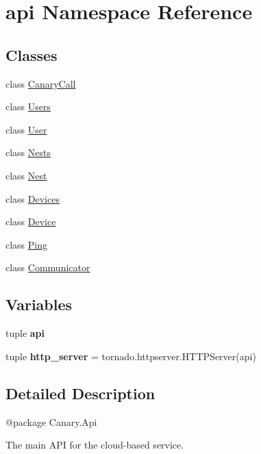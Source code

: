 \hypertarget{namespaceapi}{\section{api Namespace Reference}
\label{namespaceapi}
}
\subsection*{Classes}
\begin{DoxyCompactItemize}
\item 
class \hyperlink{classapi_1_1_canary_call}{Canary\-Call}
\item 
class \hyperlink{classapi_1_1_users}{Users}
\item 
class \hyperlink{classapi_1_1_user}{User}
\item 
class \hyperlink{classapi_1_1_nests}{Nests}
\item 
class \hyperlink{classapi_1_1_nest}{Nest}
\item 
class \hyperlink{classapi_1_1_devices}{Devices}
\item 
class \hyperlink{classapi_1_1_device}{Device}
\item 
class \hyperlink{classapi_1_1_ping}{Ping}
\item 
class \hyperlink{classapi_1_1_communicator}{Communicator}
\end{DoxyCompactItemize}
\subsection*{Variables}
\begin{DoxyCompactItemize}
\item 
tuple {\bfseries api}
\item 
\hypertarget{namespaceapi_a1125afafaabf4d39e0f633946f62eecd}{tuple {\bfseries http\-\_\-server} = tornado.\-httpserver.\-H\-T\-T\-P\-Server(api)}\label{namespaceapi_a1125afafaabf4d39e0f633946f62eecd}

\end{DoxyCompactItemize}


\subsection{Detailed Description}
\begin{DoxyVerb}@package Canary.Api

The main API for the cloud-based service.
\end{DoxyVerb}
 

